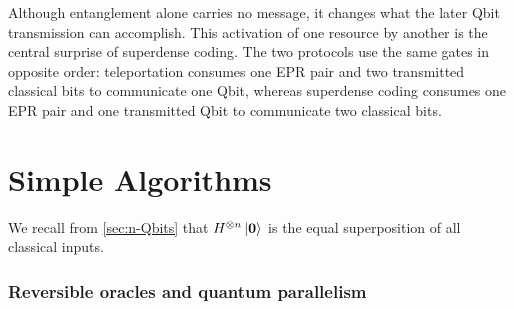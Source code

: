 Although entanglement alone carries no message, it changes what the later Qbit transmission can accomplish.
This activation of one resource by another is the central surprise of superdense coding.
The two protocols use the same gates in opposite order:
teleportation consumes one EPR pair and two transmitted classical bits to communicate one Qbit, whereas superdense coding consumes one EPR pair and one transmitted Qbit to communicate two classical bits.


\clearpage



\section{Simple Algorithms}\label{sec:simple-algorithms}




We recall from \autoref{sec:n-Qbits} that $H^{\otimes n}\ket{{\boldsymbol{0}}}$ is the equal superposition of all classical inputs.


\subsubsection{Reversible oracles and quantum parallelism}

